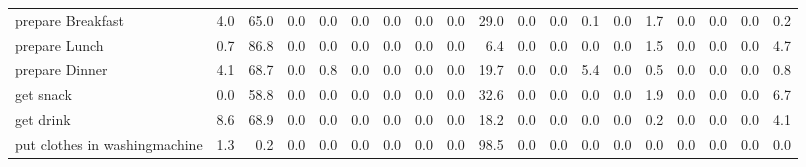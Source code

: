 \documentclass{article}
\begin{document}
\begin{sideways}
\begin{tabular}{lrrrrrrrrrrrrrrrrrr}
prepare Breakfast             &         4.0 &               65.0 &           0.0 &                          0.0 &                0.0 &                0.0 &                        0.0 &          0.0 &             29.0 &                0.0 &                    0.0 &                      0.1 &                  0.0 &                   1.7 &              0.0 &              0.0 &                                  0.0 &          0.2 \\
prepare Lunch                 &         0.7 &               86.8 &           0.0 &                          0.0 &                0.0 &                0.0 &                        0.0 &          0.0 &              6.4 &                0.0 &                    0.0 &                      0.0 &                  0.0 &                   1.5 &              0.0 &              0.0 &                                  0.0 &          4.7 \\
prepare Dinner                &         4.1 &               68.7 &           0.0 &                          0.8 &                0.0 &                0.0 &                        0.0 &          0.0 &             19.7 &                0.0 &                    0.0 &                      5.4 &                  0.0 &                   0.5 &              0.0 &              0.0 &                                  0.0 &          0.8 \\
get snack                     &         0.0 &               58.8 &           0.0 &                          0.0 &                0.0 &                0.0 &                        0.0 &          0.0 &             32.6 &                0.0 &                    0.0 &                      0.0 &                  0.0 &                   1.9 &              0.0 &              0.0 &                                  0.0 &          6.7 \\
get drink                     &         8.6 &               68.9 &           0.0 &                          0.0 &                0.0 &                0.0 &                        0.0 &          0.0 &             18.2 &                0.0 &                    0.0 &                      0.0 &                  0.0 &                   0.2 &              0.0 &              0.0 &                                  0.0 &          4.1 \\
put clothes in washingmachine &         1.3 &                0.2 &           0.0 &                          0.0 &                0.0 &                0.0 &                        0.0 &          0.0 &             98.5 &                0.0 &                    0.0 &                      0.0 &                  0.0 &                   0.0 &              0.0 &              0.0 &                                  0.0 &          0.0 \\

\end{tabular}
\end{sideways}
\end{document}
